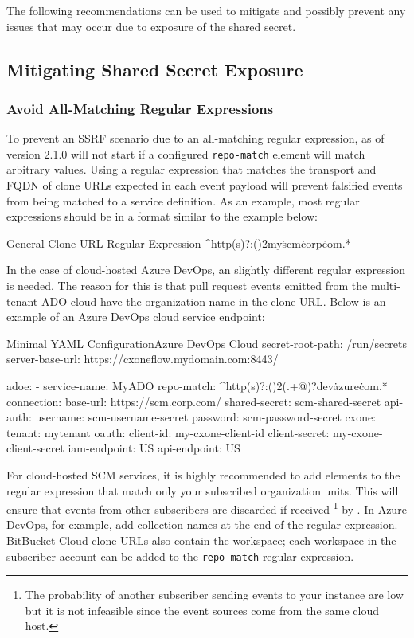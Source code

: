 The following recommendations can be used to mitigate and possibly prevent any
issues that may occur due to exposure of the shared secret.

\subsection{Mitigating Shared Secret Exposure}


\subsubsection{Avoid All-Matching Regular Expressions}

To prevent an SSRF scenario due to an all-matching regular expression, 
\cxoneflow as of version 2.1.0 will not start if a configured \texttt{repo-match} element
will match arbitrary values. Using a regular expression that matches the transport and FQDN
of clone URLs expected in each event payload will prevent falsified events from being matched to a 
service definition.  As an example, most regular expressions should be in a format similar to
the example below:

\begin{code}{General Clone URL Regular Expression}{}{}
^http(s)?:(\/){2}my\.scm\.corp\.com.*
\end{code}


In the case of cloud-hosted Azure DevOps, an slightly different regular expression
is needed.  The reason for this is that pull request events emitted from the multi-tenant ADO cloud have
the organization name in the clone URL.  Below is an example of an Azure DevOps cloud
service endpoint:

\begin{code}{Minimal YAML Configuration}{Azure DevOps Cloud}{}
  secret-root-path: /run/secrets
  server-base-url: https://cxoneflow.mydomain.com:8443/
  
  adoe:
      - service-name: MyADO
        repo-match: ^http(s)?:(\/){2}(.+@)?dev\.azure\.com.*
        connection:
        base-url: https://scm.corp.com/
        shared-secret: scm-shared-secret
        api-auth:
          username: scm-username-secret
          password: scm-password-secret
        cxone:
          tenant: mytenant
          oauth:
            client-id: my-cxone-client-id
            client-secret: my-cxone-client-secret
          iam-endpoint: US
          api-endpoint: US
\end{code}

For cloud-hosted SCM services, it is highly recommended to add elements to the regular
expression that match only your subscribed organization units.  This will ensure
that events from other subscribers are discarded if received 
\footnote{The probability of another subscriber sending events to your \cxoneflow instance
are low but it is not infeasible since the event sources come from the same cloud host.}
by \cxoneflowns. In Azure DevOps,
for example, add collection names at the end of the regular expression. BitBucket Cloud
clone URLs also contain the workspace; each workspace in the subscriber account can be
added to the \texttt{repo-match} regular expression.


